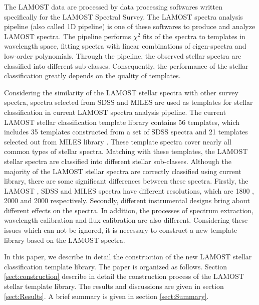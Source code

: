 \documentclass[manuscript]{aastex}
\begin{document}
The LAMOST data are processed by data processing softwares written specifically for the LAMOST Spectral Survey.
The LAMOST spectra analysis pipeline (also called 1D pipeline) \citep{luo2001steps,luo2004design,luo2008automated,wang2010calibration,luo2012data} is one of these softwares to produce and analyze LAMOST spectra.
The pipeline performs  $\chi^2$ fits of the spectra to templates in wavelength space,
fitting spectra with linear combinations of eigen-spectra and low-order polynomials.
Through the pipeline, the observed stellar spectra are classified into different sub-classes.
Consequently, the performance of the stellar classification greatly depends on the quality of templates.

Considering the similarity of  the LAMOST stellar spectra with other survey spectra,
spectra  selected from SDSS and MILES \citep{falcon2011updated} are used as templates for stellar classification in current LAMOST spectra analysis pipeline.
The current LAMOST stellar classification template library contains 56 templates,
which includes 35 templates constructed from a set of SDSS spectra \citep{wang2010calibration} and
21 templates selected out from MILES library \citep{falcon2011updated}.
These template spectra cover nearly all common types of stellar spectra.
Matching with these templates, the LAMOST stellar spectra are classified into different stellar sub-classes.
Although the majority of the LAMOST stellar spectra are correctly classified using current library,
there are some significant  differences between these spectra.
Firstly, the LAMOST , SDSS and MILES spectra have different resolutions, which are 1800 , 2000 and 2000 respectively.
Secondly, different instrumental designs bring about different effects on the spectra.
In addition, the processes of spectrum extraction, wavelength calibration and flux calibration \citep{bai2012lamost} are also different.
Considering these issues which can not be ignored, it is necessary to construct a new template library based on the  LAMOST spectra.


In this paper, we describe  in detail the construction of the new LAMOST stellar  classification template library.
The paper is organized as follows.
Section \ref{sect:construction}  describe in detail the construction process of the LAMOST stellar template library.
The results and discussions are given in section \ref{sect:Results}.
A brief summary is given in section \ref{sect:Summary}.
\end{document}
